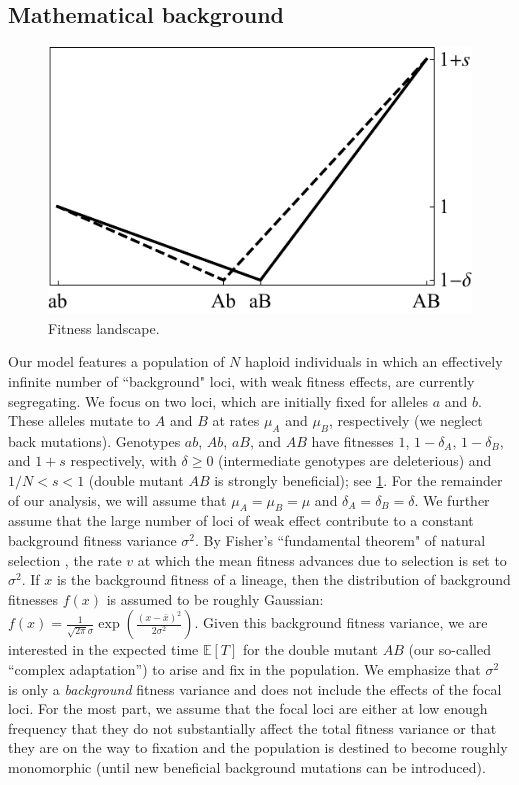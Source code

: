 \documentclass[10pt,twocolumn,twoside]{gsajnl}
\begin{document}
\begin{spacing}{1.5}
\section{Mathematical background}

\begin{figure}[t]
\begin{center}
  \includegraphics[scale=0.75]{Figures/valley.pdf}
  \caption{Fitness landscape.}
  \label{fig:landscape}
\end{center}
\end{figure}

Our model features a population of $N$ haploid individuals in which an effectively infinite number of ``background" loci, with weak fitness effects, are currently segregating.
We focus on two loci, which are initially fixed for alleles $a$ and $b$.
These alleles mutate to $A$ and $B$ at rates $\mu_A$ and $\mu_B$, respectively (we neglect back mutations).
Genotypes $ab$, $Ab$, $aB$, and $AB$ have fitnesses $1$, $1-\delta_A$, $1-\delta_B$, and $1+s$ respectively, with $\delta \geq 0$ (intermediate genotypes are deleterious) and $1/N < s < 1$ (double mutant $AB$ is strongly beneficial); see \ref{fig:landscape}.
For the remainder of our analysis, we will assume that $\mu_A = \mu_B = \mu$ and $\delta_A = \delta_B = \delta$.
We further assume that the large number of loci of weak effect contribute to a constant background fitness variance $\sigma^2$.
By Fisher's ``fundamental theorem" of natural selection \citep{Fisher:1930}, the rate $v$ at which the mean fitness advances due to selection is set to $\sigma^{2}$.
If $x$ is the background fitness of a lineage, then the distribution of background fitnesses $f(x)$ is assumed to be roughly Gaussian: $f(x) = \frac{1}{\sqrt{2\pi}\sigma} \exp (\frac{(x-\bar{x})^2}{2\sigma^2})$.
Given this background fitness variance, we are interested in the expected time $\mathbb{E}\left[ T\right]$ for the double mutant $AB$ (our so-called ``complex adaptation'') to arise and fix in the population.
We emphasize that $\sigma^2$ is only a \emph{background} fitness variance and does not include the effects of the focal loci.
For the most part, we assume that the focal loci are either at low enough frequency that they do not substantially affect the total fitness variance or that they are on the way to fixation and the population is destined to become roughly monomorphic (until new beneficial background mutations can be introduced).


\end{spacing}
\end{document}
